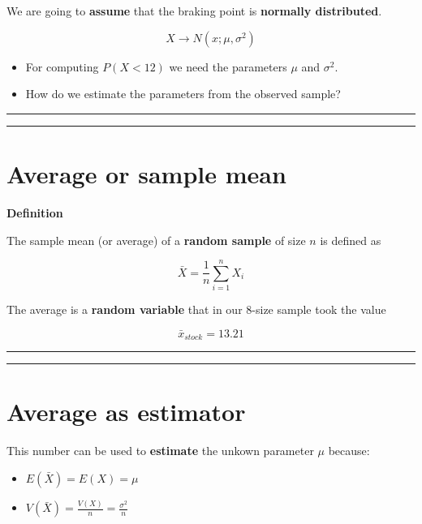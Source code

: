 \documentclass[
]{book}
\providecommand{\tightlist}{%
  \setlength{\itemsep}{0pt}\setlength{\parskip}{0pt}}
\begin{document}
We are going to \textbf{assume} that the braking point is \textbf{normally distributed}.

\[X \rightarrow N(x; \mu, \sigma^2)\]

\begin{itemize}
\item
  For computing \(P(X <12)\) we need the parameters \(\mu\) and \(\sigma^2\).
\item
  How do we estimate the parameters from the observed sample?
\end{itemize}

\begin{center}\rule{0.5\linewidth}{0.5pt}\end{center}

\begin{center}\rule{0.5\linewidth}{0.5pt}\end{center}

\hypertarget{average-or-sample-mean}{%
\section{Average or sample mean}\label{average-or-sample-mean}}

\textbf{Definition}

The sample mean (or average) of a \textbf{random sample} of size \(n\) is defined as

\[\bar{X}=\frac{1}{n}\sum_{i=1}^n X_i\]

The average is a \textbf{random variable} that in our \(8\)-size sample took the value

\[\bar{x}_{stock}=13.21\]

\begin{center}\rule{0.5\linewidth}{0.5pt}\end{center}

\begin{center}\rule{0.5\linewidth}{0.5pt}\end{center}

\hypertarget{average-as-estimator}{%
\section{Average as estimator}\label{average-as-estimator}}

This number can be used to \textbf{estimate} the unkown parameter \(\mu\) because:

\begin{itemize}
\tightlist
\item
  \(E(\bar{X})=E(X)=\mu\)
\item
  \(V(\bar{X})=\frac{V(X)}{n}=\frac{\sigma^2}{n}\)
\end{itemize}
\end{document}
